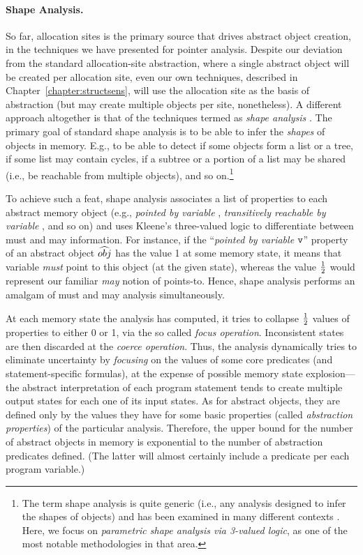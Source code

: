 \paragraph{Shape Analysis.}

So far, allocation sites is the primary source that drives abstract
object creation, in the techniques we have presented for pointer
analysis.
%
Despite our deviation from the
standard allocation-site abstraction, where a single abstract object
will be created per allocation site, even our own techniques,
described in Chapter~\ref{chapter:structsens}, will use the allocation
site as the basis of abstraction (but may create multiple objects per
site, nonetheless). A different approach altogether is that of the
techniques termed as \emph{shape analysis}
\cite{toplas/SagivRW02,popl/SagivRW99,sas/ManevichSRF04,sas/Lev-AmiS00,toplas/SagivRW98,sefm/FerraraFJ12}.
The primary goal of standard shape analysis is to be able to infer the
\emph{shapes} of objects in memory. E.g., to be able to detect if some
objects form a list or a tree, if some list may contain cycles, if a
subtree or a portion of a list may be shared (i.e., be reachable from
multiple objects), and so on.\footnote{The term shape analysis is
  quite generic (i.e., any analysis designed to infer the shapes of
  objects) and has been examined in many different contexts
  \cite{popl/GhiyaH96}. Here, we focus on \emph{parametric shape
    analysis via 3-valued logic}, as one of the most notable
  methodologies in that area.}

To achieve such a feat, shape analysis associates a list of properties
to each abstract memory object (e.g., \emph{pointed by variable
  }, \emph{transitively reachable by variable }, and so
on) and uses Kleene's three-valued logic to differentiate between must
and may information. For instance, if the ``\emph{pointed by variable}
\(\texttt{v}\)'' property of an abstract object \(\widehat{obj}\) has the
value 1 at some memory state, it means that variable 
\emph{must} point to this object (at the given state), whereas the
value \(1\over{2}\) would represent our familiar \emph{may} notion of
points-to. Hence, shape analysis performs an amalgam of must and may
analysis simultaneously.

At each memory state the analysis has computed, it tries to collapse
\(1\over{2}\) values of properties to either 0 or 1, via the so called
\emph{focus operation}. Inconsistent states are then discarded at the
\emph{coerce operation}. Thus, the analysis dynamically tries to
eliminate uncertainty by \emph{focusing} on the values of some core
predicates (and statement-specific formulas), at the expense of
possible memory state explosion---the abstract interpretation of each
program statement tends to create multiple output states for each one
of its input states.  As for abstract objects, they are defined only
by the values they have for some basic properties (called
\emph{abstraction properties}) of the particular analysis. Therefore,
the upper bound for the number of abstract objects in memory is
exponential to the number of abstraction predicates defined. (The
latter will almost certainly include a predicate per each program
variable.)

